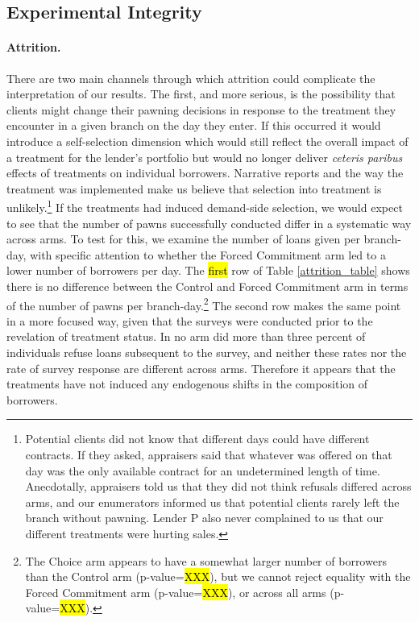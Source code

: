 \documentclass[oneside,11pt]{article}
\begin{document}
\subsection{Experimental Integrity}
\label{sec:integrity}

\paragraph{Attrition.} There are two main channels through which attrition could complicate the interpretation of our results. The first, and more serious, is the possibility that clients might change their pawning decisions in response to the treatment they encounter in a given branch on the day they enter.  If this occurred it would introduce a self-selection dimension which would still reflect the overall impact of a treatment for the lender's portfolio but would no longer deliver \textit{ceteris paribus} effects of treatments on individual borrowers.  Narrative reports and the way the treatment was implemented make us believe that selection into treatment is unlikely.\footnote{Potential clients did not know that different days could have different contracts. If they asked, appraisers said that whatever was offered on that day was the only available contract for an undetermined length of time. Anecdotally, appraisers told us that they did not think refusals differed across arms, and our enumerators informed us that potential clients rarely left the branch without pawning. Lender P also never complained to us that our different treatments were hurting sales.} If the treatments had induced demand-side selection, we would expect to see that the number of pawns successfully conducted differ in a systematic way across arms.  To test for this, we examine the number of loans given per branch-day, with specific attention to whether the Forced Commitment arm led to a lower number of borrowers per day. The \hl{first} row of Table \ref{attrition_table} shows there is no difference between the Control and Forced Commitment arm in terms of the number of pawns per branch-day.\footnote{The Choice arm appears to have a somewhat larger number of borrowers than the Control arm (p-value=\hl{XXX}), but we cannot reject equality with the Forced Commitment arm (p-value=\hl{XXX}), or across all arms (p-value=\hl{XXX}).}  The second row makes the same point in a more focused way, given that the surveys were conducted prior to the revelation of treatment status.  In no arm did more than three percent of individuals refuse loans subsequent to the survey, and neither these rates nor the rate of survey response are different across arms.  Therefore it appears that the treatments have not induced any endogenous shifts in the composition of borrowers.
\end{document}
